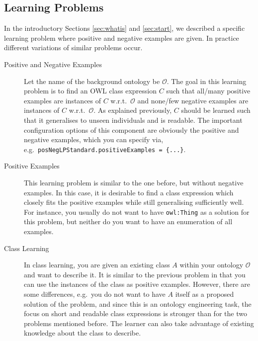\documentclass[a4paper,12pt]{scrartcl}
\begin{document}
\subsection{Learning Problems}

In the introductory Sections \ref{sec:whatis} and \ref{sec:start}, we described a specific learning problem where positive and negative examples are given. In practice different variations of similar problems occur. 

\begin{description}
 \item[Positive and Negative Examples] Let the name of the background ontology be $\mathcal{O}$. The goal in this learning problem is to find an OWL class expression $C$ such that all/many positive examples are instances of $C$ w.r.t.~$\mathcal{O}$ and none/few negative examples are instances of $C$ w.r.t.~$\mathcal{O}$. As explained previously, $C$ should be learned such that it generalises to unseen individuals and is readable. The important configuration options of this component are obviously the positive and negative examples, which you can specify via, e.g.~\verb|posNegLPStandard.positiveExamples = {...}|.
 \item[Positive Examples] This learning problem is similar to the one before, but without negative examples. In this case, it is desirable to find a class expression which closely fits the positive examples while still generalising sufficiently well. For instance, you usually do not want to have \verb|owl:Thing| as a solution for this problem, but neither do you want to have an enumeration of all examples.
 \item[Class Learning] In class learning, you are given an existing class $A$ within your ontology $\mathcal{O}$ and want to describe it. It is similar to the previous problem in that you can use the instances of the class as positive examples. However, there are some differences, e.g.~you do not want to have $A$ itself as a proposed solution of the problem, and since this is an ontology engineering task, the focus on short and readable class expressions is stronger than for the two problems mentioned before. The learner can also take advantage of existing knowledge about the class to describe.
\end{description}
\end{document}
